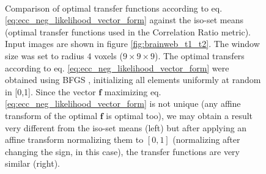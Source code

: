 \begin{figure}[p]
\centering
    \\
    \caption{Comparison of optimal transfer functions according to eq. \eqref{eq:ecc_neg_likelihood_vector_form} against the iso-set means (optimal transfer functions used in the Correlation Ratio metric). Input images are shown in figure \ref{fig:brainweb_t1_t2}. The window size was set to radius $4$ voxels ($9\times 9\times 9$). The optimal transfers according to eq. \eqref{eq:ecc_neg_likelihood_vector_form} were obtained using BFGS \citep{GVK502988711}, initializing all elements uniformly at random in [0,1]. Since the vector $\mathbf{f}$ maximizing eq. \eqref{eq:ecc_neg_likelihood_vector_form} is not unique (any affine transform of the optimal $\mathbf{f}$ is optimal too), we may obtain a result very different from the iso-set means (left) but after applying an affine transform normalizing them to $[0,1]$ (normalizing after changing the sign, in this case), the transfer functions are very similar (right).}
\label{fig:comparison_optimal_transfers}
\end{figure}

